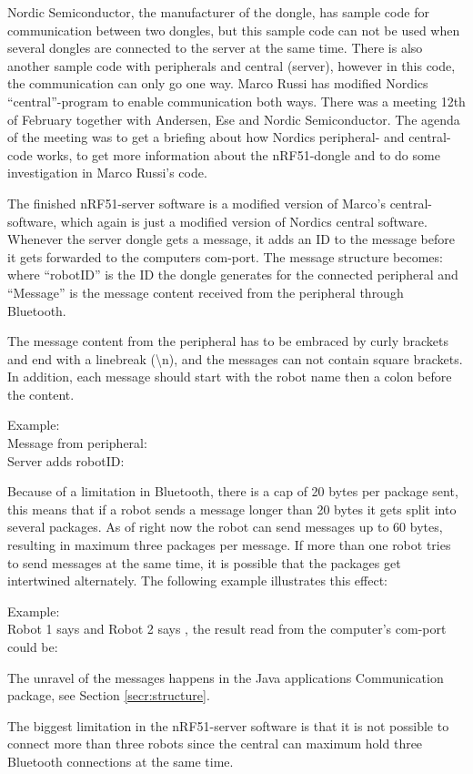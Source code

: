 Nordic Semiconductor, the manufacturer of the dongle, has sample code for communication between two dongles, but this sample code can not be used when several dongles are connected to the server at the same time. There is also another sample code with peripherals and central (server), however in this code, the communication can only go one way. Marco Russi  \cite{marcoRussi} has modified Nordics ``central''-program to enable communication both ways. There was a meeting 12th of February together with Andersen, Ese and Nordic Semiconductor. The agenda of the meeting was to get a briefing about how Nordics peripheral- and central-code works, to get more information about the nRF51-dongle and to do some investigation in Marco Russi's code.

The finished nRF51-server software is a modified version of Marco's central-software, which again is just a modified version of Nordics central software. Whenever the server dongle gets a message, it adds an ID to the message before it gets forwarded to the computers \acrshort{com}-port. The message structure becomes: where ``robotID'' is the ID the dongle generates for the connected peripheral and ``Message'' is the message content received from the peripheral through Bluetooth. 

The message content from the peripheral has to be embraced by curly brackets and end with a linebreak (\textbackslash n), and the messages can not contain square brackets. In addition, each message should start with the robot name then a colon before the content. 

Example:\\
Message from peripheral:  \\
Server adds robotID: 

Because of a limitation in Bluetooth, there is a cap of 20 bytes per package sent, this means that if a robot sends a message longer than 20 bytes it gets split into several packages. As of right now the robot can send messages up to 60 bytes, resulting in maximum three packages per message. If more than one robot tries to send messages at the same time, it is possible that the packages get intertwined alternately. The following example illustrates this effect:

Example:\\
Robot 1 says  and Robot 2 says , the result read from the computer's \acrshort{com}-port could be: \\

The unravel of the messages happens in the Java applications Communication package, see Section \ref{secr:structure}. 

The biggest limitation in the nRF51-server software is that it is not possible to connect more than three robots since the central can maximum hold three Bluetooth connections at the same time.